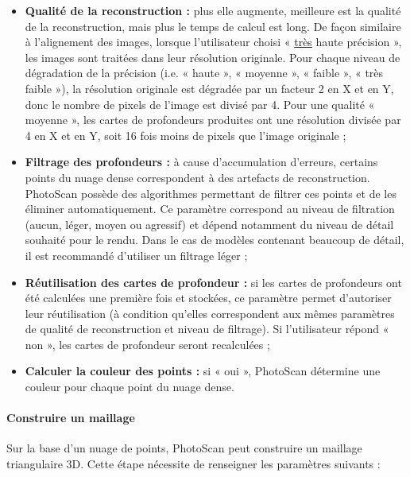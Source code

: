\begin{itemize}
    \item \textbf{Qualité de la reconstruction :} plus elle augmente, meilleure est la qualité de la reconstruction, mais plus le temps de calcul est long. De façon similaire à l’alignement des images, lorsque l’utilisateur choisi « \underline{très} haute précision », les images sont traitées dans leur résolution originale. Pour chaque niveau de dégradation de la précision (i.e. « haute », « moyenne », « faible », « très faible »), la résolution originale est dégradée par un facteur 2 en X et en Y, donc le nombre de pixels de l’image est divisé par 4. Pour une qualité « moyenne », les cartes de profondeurs produites ont une résolution divisée par 4 en X et en Y, soit 16 fois moins de pixels que l’image originale ;
    
    \item \textbf{Filtrage des profondeurs :} à cause d’accumulation d’erreurs, certains points du nuage dense correspondent à des artefacts de reconstruction. PhotoScan possède des algorithmes permettant de filtrer ces points et de les éliminer automatiquement. Ce paramètre correspond au niveau de filtration (aucun, léger, moyen ou agressif) et dépend notamment du niveau de détail souhaité pour le rendu. Dans le cas de modèles contenant beaucoup de détail, il est recommandé d’utiliser un filtrage léger ;
    
    \item \textbf{Réutilisation des cartes de profondeur :} si les cartes de profondeurs ont été calculées une première fois et stockées, ce paramètre permet d’autoriser leur réutilisation (à condition qu’elles correspondent aux mêmes paramètres de qualité de reconstruction et niveau de filtrage). Si l’utilisateur répond « non », les cartes de profondeur seront recalculées ;
    
    \item \textbf{Calculer la couleur des points :} si « oui », PhotoScan détermine une couleur pour chaque point du nuage dense. 
\end{itemize}

\paragraph{Construire un maillage}

Sur la base d’un nuage de points, PhotoScan peut construire un maillage triangulaire 3D. Cette étape nécessite de renseigner les paramètres suivants :


